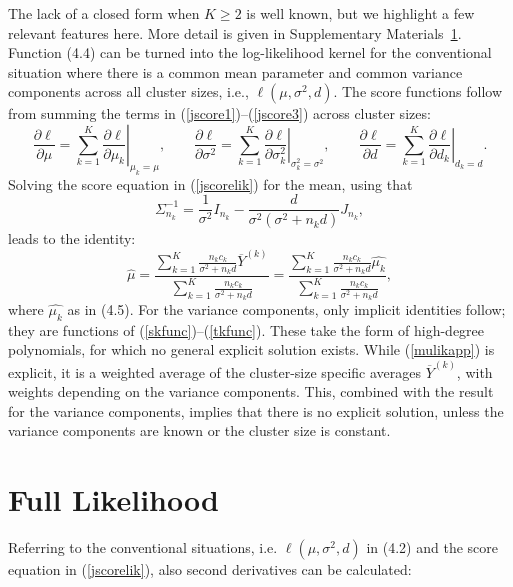 \documentclass[11pt,a5paper,twoside]{book}
\begin{document}
{The lack of a closed form when $K\ge 2$ is well known, but we highlight a few relevant features here. More detail is given in Supplementary Materials~\ref{appB}.
Function (4.4)
can be turned into the log-likelihood kernel for the conventional situation where there is a common mean parameter and common variance components across all cluster sizes, i.e., $\ell(\mu,\sigma^2,d)$. The score functions follow from summing the terms in (\ref{jscore1})--(\ref{jscore3}) across cluster sizes:
\begin{equation}
\label{jscorelik}
\frac{\partial \ell}{\partial \mu}=
\sum_{k=1}^K\left.\frac{\partial \ell}{\partial \mu_k}\right|_{\mu_k=\mu},\qquad
\frac{\partial \ell}{\partial \sigma^2}=
\sum_{k=1}^K\left.\frac{\partial \ell}{\partial \sigma^2_k}\right|_{\sigma^2_k=\sigma^2},
\qquad
\frac{\partial \ell}{\partial d}=
\sum_{k=1}^K\left.\frac{\partial \ell}{\partial d_k}\right|_{d_k=d}.
\end{equation}
Solving the score equation in (\ref{jscorelik}) for the mean, using that
$$\Sigma_{n_k}^{-1}=\frac{1}{\sigma^2}I_{n_k}-\frac{d}{\sigma^2(\sigma^2+n_kd)}J_{n_k},$$
leads to the identity:
\begin{equation}
\widehat{\mu}=\frac
{
\sum_{k=1}^K\frac{n_k c_k}{\sigma^2+n_k d} \overline{Y}^{(k)}
}
{
\sum_{k=1}^K\frac{n_k c_k}{\sigma^2+n_k d}
}
=
\frac
{
\sum_{k=1}^K\frac{n_k c_k}{\sigma^2+n_k d} \widehat{\mu_k}
}
{
\sum_{k=1}^K\frac{n_k c_k}{\sigma^2+n_k d}
},
\label{mulikapp}
\end{equation}
where $\widehat{\mu_k}$ as in (4.5).
For the variance components, only implicit identities follow; they are functions of (\ref{skfunc})--(\ref{tkfunc}). These take the form of high-degree polynomials, for which no general explicit solution exists.  While (\ref{mulikapp}) is explicit, it is a weighted average of the cluster-size specific averages $\overline{Y}^{(k)}$, with weights depending on the variance components.  This, combined with the result for the variance components, implies that there is no explicit solution, unless the variance components are known or the cluster size is constant.

\setcounter{equation}{0}
\section{Full Likelihood}
 \label{appB}

Referring to the conventional situations, i.e. $\ell(\mu,\sigma^2,d)$ in (4.2)
and the score equation in (\ref{jscorelik}), also second derivatives can be calculated:


}
\end{document}
